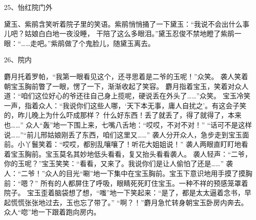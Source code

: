 25、怡红院门外\par
黛玉、紫鹃含笑听着院子里的笑语。紫鹃悄悄捅了一下黛玉：“我说不会出什么事儿吧？姑娘白白地一夜没睡，
干陪了这么多眼泪。”黛玉忍俊不禁地瞪了紫鹃一眼：“……走吧。”紫鹃做了个鬼脸儿，随黛玉离去。

26、院内\par
麝月托着罗帕，“我第一眼看见这个，还寻思着是二爷的玉呢！”众笑。
袭人笑着朝宝玉胸前瞥了一眼，愣了一下，渐渐收起了笑容。
麝月指着宝玉，笑着对众人道：“咱们这位好心的爷还往自己身上揽呢，硬说丢在外头了……”众笑。
宝玉冷笑一声，指着众人：“我说你们这些人哪，‘天下本无事，庸人自扰之’。有这会子笑的，昨儿晚上为什么吓成那样？
什么好东西！丢了就丢了，得了就得了，本来也……”
众人“轰”地一下围上来，七嘴八舌地：“哎哎，不对不对！”
“话可不是这样说……”“前儿邢姑娘刚丢了东西，咱们这里又……”
袭人分开众人，急步走到宝玉面前。小丫鬟笑着：“哎哎，都别乱嚷嚷了！听花大姐姐说！”
袭人两眼直盯盯地看着宝玉胸前。宝玉莫名其妙地低头看看，复又抬头看看袭人。
袭人轻声：“二爷，你的玉呢？”宝玉笑笑：“看看，又来了。我说你们是让人偷怕了还是……”
袭人：“二爷！”众人的目光“唰”地一下集中在宝玉胸前。宝玉下意识地用手摸了摸胸前：“嗯？”
所有的人都屏住了呼吸，眼睛死死盯住宝玉。一种不祥的预感笼罩着院子。
宝玉歪着脑袋想了想，“嗤”地一下笑起来：“是了，都是太太逼着念书，早起慌慌张张地过去，玉也忘了带了。”
“啊？！”麝月急忙转身朝宝玉卧房内奔去。众人“唿”地一下跟着跑向房内。

